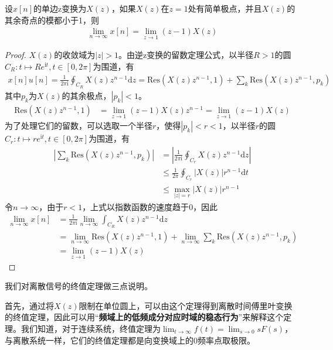 \begin{theorem}[单边z变换的终值定理]
    设$x[n]$的单边z变换为$X(z)$，如果$X(z)$在$z=1$处有简单极点，并且$X(z)$的其余奇点的模都小于1，则\begin{align*}
    \lim_{n\to\infty}x[n]=\lim_{z\to 1}(z-1)X(z)
    \end{align*}
\end{theorem}
\begin{proof}
    $X(z)$的收敛域为$|z|>1$。由逆z变换的留数定理公式，以半径$R>1$的圆$C_R:t\mapsto Re^{\mathrm{i}t},t\in[0,2\pi]$为围道，有\begin{align*}
    x[n]u[n]=\frac{1}{2\pi\mathrm{i}}\oint_{C_R}X(z)z^{n-1}\mathrm{d}z=\mathrm{Res}(X(z)z^{n-1},1)+\sum_{k}\mathrm{Res}(X(z)z^{n-1},p_k)
    \end{align*}
    其中$p_k$为$X(z)$的其余极点，$|p_k|<1$。
    \begin{align*}
        \mathrm{Res}(X(z)z^{n-1},1)&=\lim_{z\to 1}(z-1)X(z)z^{n-1}=\lim_{z\to 1}(z-1)X(z)
    \end{align*}
    为了处理它们的留数，可以选取一个半径$r$，使得$|p_k|<r<1$，以半径$r$的圆$C_{r}:t\mapsto re^{\mathrm{i}t},t\in[0,2\pi]$为围道，有\begin{align*}
    \left|\sum_{k}\mathrm{Res}(X(z)z^{n-1},p_k)\right|&=\left|\frac{1}{2\pi\mathrm{i}}\oint_{C_r}X(z)z^{n-1}\mathrm{d}z\right|\\
    &\leq \frac{1}{2\pi}\oint_{C_r}|X(z)|r^{n-1}\mathrm{d}t\\
    &\leq \max_{|z|=r}|X(z)|r^{n-1}
    \end{align*}
    令$n\to\infty$，由于$r<1$，上式以指数函数的速度趋于$0$，因此\begin{align*}
    \lim_{n\to\infty}x[n]&=\frac{1}{2\pi\mathrm{i}}\lim_{n\to\infty}\int_{C_R}X(z)z^{n-1}\mathrm{d}z\\
    &=\lim_{n\to\infty}\mathrm{Res}(X(z)z^{n-1},1)+\lim_{n\to\infty}\sum_{k}\mathrm{Res}(X(z)z^{n-1},p_k)\\
    &=\lim_{z\to 1}(z-1)X(z)
    \end{align*}
\end{proof}

我们对离散信号的终值定理做三点说明。

首先，通过将$X(z)$限制在单位圆上，可以由这个定理得到离散时间傅里叶变换的终值定理，因此可以用“\textbf{频域上的低频成分对应时域的稳态行为}”来解释这个定理。我们知道，对于连续系统，终值定理为$\lim_{t\to\infty}f(t)=\lim_{s\to 0}sF(s)$，与离散系统一样，它们的终值定理都是向变换域上的$0$频率点取极限。

